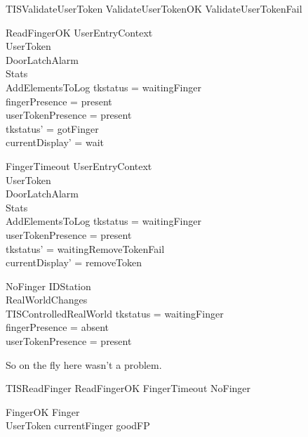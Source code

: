 \begin{zed}
TISValidateUserToken  ValidateUserTokenOK \lor
						   ValidateUserTokenFail \lor
						  [UserTokenTorn | tkstatus = gotUserToken]
\end{zed}

\begin{schema}{ReadFingerOK}
  UserEntryContext\\
  \Xi UserToken\\
  \Xi DoorLatchAlarm\\
  \Xi Stats\\
  AddElementsToLog
\where
  tkstatus = waitingFinger\\
  fingerPresence = present\\
  userTokenPresence = present\\
  tkstatus' = gotFinger\\
  currentDisplay' = wait
\end{schema}

\begin{schema}{FingerTimeout}
  UserEntryContext\\
  \Xi UserToken\\
  \Xi DoorLatchAlarm\\
  \Xi Stats\\
  AddElementsToLog
\where
  tkstatus = waitingFinger\\
  userTokenPresence = present\\
  tkstatus' = waitingRemoveTokenFail\\
  currentDisplay' = removeToken
\end{schema}

\begin{schema}{NoFinger}
  \Xi IDStation\\
  RealWorldChanges\\
  \Xi TISControlledRealWorld
\where
  tkstatus = waitingFinger\\
  fingerPresence = absent\\
  userTokenPresence = present
\end{schema}

So on the fly here wasn't a problem.
\begin{zed}
TISReadFinger  ReadFingerOK \lor  FingerTimeout \lor  NoFinger \lor  [UserTokenTorn | tkstatus = waitingFinger]
\end{zed}

\begin{schema}{FingerOK}
  Finger\\
  UserToken
\where
  currentFinger \in  \ran  goodFP
\end{schema}

